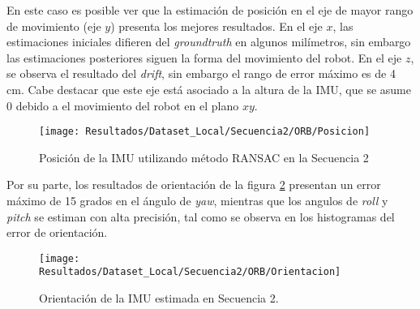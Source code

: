 En este caso es posible ver que la estimación de posición en el eje de mayor rango de movimiento (eje $y$) presenta los mejores resultados. En el eje $x$, las estimaciones iniciales  difieren del \textit{groundtruth} en algunos milímetros, sin embargo las estimaciones posteriores siguen la forma del movimiento del robot. En el eje $z$, se observa el resultado del \textit{drift}, sin embargo el rango de error máximo es de 4 cm. Cabe destacar que este eje está asociado a la altura de la IMU, que se asume 0 debido a el movimiento del robot en el plano $xy$.

\begin{figure}[H]
	\centering
	\texttt{[image: Resultados/Dataset\_Local/Secuencia2/ORB/Posicion]}
	\caption{Posición de la IMU utilizando método RANSAC en la Secuencia 2}
	\label{imagen:Resultados/Dataset_Local/Secuencia2/ORB/Posicion}
\end{figure}

Por su parte, los resultados de orientación de la figura \ref{imagen:Resultados/Dataset_Local/Secuencia2/ORB/Orientacion} presentan un error máximo de 15 grados en el ángulo de \textit{yaw}, mientras que los angulos de \textit{roll} y \textit{pitch} se estiman con alta precisión, tal como se observa en los histogramas del error de orientación.

\begin{figure}[H]
	\centering
	\texttt{[image: Resultados/Dataset\_Local/Secuencia2/ORB/Orientacion]}
	\caption[Orientación de la IMU estimada en la Secuencia 2]{Orientación de la IMU estimada en Secuencia 2.}
	\label{imagen:Resultados/Dataset_Local/Secuencia2/ORB/Orientacion}
\end{figure}


%
%
%
%


